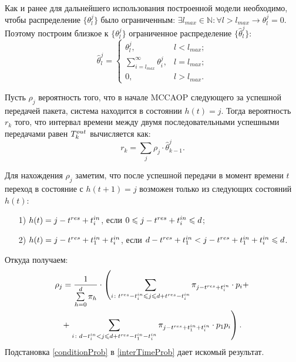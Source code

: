 Как и ранее для дальнейшего использования построенной модели необходимо, чтобы распределение $\{\theta_l^j\}$ было ограниченным: $\exists l_{max} \in \mathbb{N} \colon \forall l > l_{max} \longrightarrow \theta_l^j = 0$. Поэтому построим близкое к $\{\theta_l^j\}$ ограниченное распределение $\{\hat{\theta}_l^j\}$:
\begin{equation}
	\hat{\theta}_l^j = \begin{cases}
		\theta_l^j, &l < l_{max};	\\
		\sum\limits_{i = l_{max}}^{\infty} \theta_i^j, &l = l_{max}; 	\\
		0,	&l > l_{max}. 
	\end{cases}
\end{equation} 

Пусть $\rho_j$ вероятность того, что в начале MCCAOP следующего за успешной передачей пакета, система находится в состоянии $h(t) = j$. Тогда вероятность $r_k$ того, что интервал времени между двумя последовательными успешными передачами равен $T^{out}_k$ вычисляется как:
\begin{equation}
	\label{interTimeProb}
	r_k = \sum\limits_{j} \rho_j \cdot \hat{\theta}_{k-1}^j.	
\end{equation}

Для нахождения $\rho_j$ заметим, что после успешной передачи в момент времени $t$ переход в состояние с $h(t+1)=j$ возможен только из следующих состояний $h(t)$:
\begin{itemize}
	\item[1)] $h(t) = j - t^{res} + t^{in}_i$, если $0 \leqslant j - t^{res} + t^{in}_i \leqslant d$;
	\item[2)] $h(t) = j - t^{res} + t^{in}_1 + t^{in}_i$, если  
				$d - t^{res} + t^{in}_1 < j - t^{res} + t^{in}_1 + t^{in}_i \leqslant d$.
\end{itemize}
Откуда получаем:
\begin{multline}
\label{conditionProb}
	\rho_j = \frac{1}{\sum\limits_{h = 0}^d\pi_h}\cdot
	\left(\sum\limits_{i\colon t^{res}-t^{in}_i \leqslant j \leqslant d+t^{res}-t^{in}_i}\pi_{j-t^{res}+t^{in}_i}\cdot 
		p_i + \right. \\
	 +\left.\sum\limits_{i\colon d - t^{in}_i < j \leqslant d+t^{res}-t^{in}_1-t^{in}_i}\pi_{j-t^{res}+t^{in}_1+t^{in}_i}\cdot 
	 p_1 p_i\right). 
\end{multline}
Подстановка \eqref{conditionProb} в  \eqref{interTimeProb} дает искомый результат.
